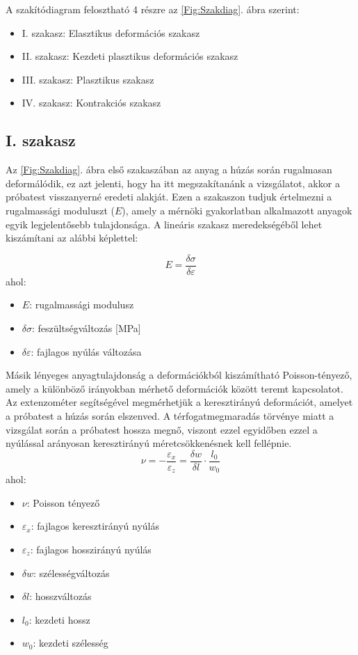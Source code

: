 \documentclass[12pt,a4paper,oneside]{report}
\begin{document}
A szakítódiagram felosztható 4 részre az \ref{Fig:Szakdiag}. ábra szerint:
\begin{itemize}
\item I. szakasz: Elasztikus deformációs szakasz
\item II. szakasz: Kezdeti plasztikus deformációs szakasz
\item III. szakasz: Plasztikus szakasz
\item IV. szakasz: Kontrakciós szakasz
\end{itemize}

\subsection{I. szakasz}
Az \ref{Fig:Szakdiag}. ábra első szakaszában az anyag a húzás során rugalmasan deformálódik, ez azt jelenti, hogy ha itt megszakítanánk a vizsgálatot, akkor a próbatest visszanyerné eredeti alakját. Ezen a szakaszon tudjuk értelmezni a rugalmassági moduluszt ($E$), amely a mérnöki gyakorlatban alkalmazott anyagok egyik legjelentősebb tulajdonsága. A lineáris szakasz meredekségéből lehet kiszámítani az alábbi képlettel:
\pagebreak

\begin{equation}
E=\dfrac{\delta \sigma}{\delta \varepsilon}
\end{equation}
ahol:
\begin{itemize}
\item $E$: rugalmassági modulusz
\item $\delta \sigma$: feszültségváltozás [MPa]
\item $\delta \varepsilon$: fajlagos nyúlás változása
\end{itemize}

Másik lényeges anyagtulajdonság a deformációkból kiszámítható Poisson-tényező, amely a különböző irányokban mérhető deformációk között teremt kapcsolatot. Az extenzométer segítségével megmérhetjük a keresztirányú deformációt, amelyet a próbatest a húzás során elszenved. A térfogatmegmaradás törvénye miatt a vizsgálat során a próbatest hossza megnő, viszont ezzel egyidőben ezzel a nyúlással arányosan keresztirányú méretcsökkenésnek kell fellépnie.
\begin{equation}
\nu=-\dfrac{\varepsilon_x}{\varepsilon_z}=\dfrac{\delta w}{\delta l}\cdot\dfrac{l_0}{w_0}
\end{equation}
ahol:
\begin{itemize}
\item $\nu$: Poisson tényező
\item $\varepsilon_x$: fajlagos keresztirányú nyúlás
\item $\varepsilon_z$: fajlagos hosszirányú nyúlás
\item $\delta w$: szélességváltozás
\item $\delta l$: hosszváltozás
\item $l_0$: kezdeti hossz
\item $w_0$: kezdeti szélesség
\end{itemize}
\end{document}
